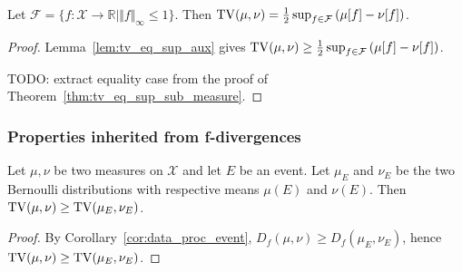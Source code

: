 \begin{theorem}
  \label{thm:tv_eq_sup_sub_integral}
  Let $\mathcal F = \{f : \mathcal X \to \mathbb{R} \mid \Vert f \Vert_\infty \le 1\}$.
  Then $\operatorname{TV}(\mu, \nu) = \frac{1}{2} \sup_{f \in \mathcal F} \left( \mu[f] - \nu[f] \right)$.
\end{theorem}

\begin{proof}
Lemma~\ref{lem:tv_eq_sup_aux} gives $\operatorname{TV}(\mu, \nu) \ge \frac{1}{2} \sup_{f \in \mathcal F} \left( \mu[f] - \nu[f] \right)$.

TODO: extract equality case from the proof of Theorem~\ref{thm:tv_eq_sup_sub_measure}.
\end{proof}

\subsubsection{Properties inherited from f-divergences}

\begin{lemma}
  \label{lem:tv_data_proc_event}
  Let $\mu, \nu$ be two measures on $\mathcal X$ and let $E$ be an event. Let $\mu_E$ and $\nu_E$ be the two Bernoulli distributions with respective means $\mu(E)$ and $\nu(E)$.
  Then $\operatorname{TV}(\mu, \nu) \ge \operatorname{TV}(\mu_E, \nu_E)$.
\end{lemma}

\begin{proof}
By Corollary~\ref{cor:data_proc_event}, $D_f(\mu, \nu) \ge D_f(\mu_E, \nu_E)$, hence $\operatorname{TV}(\mu, \nu) \ge \operatorname{TV}(\mu_E, \nu_E)$.
\end{proof}
